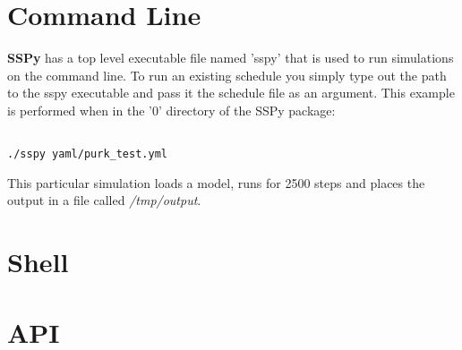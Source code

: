 \documentclass[12pt]{article}
\begin{document}
\section*{Command Line}

	{\bf SSPy} has a top level executable file named 'sspy' that is used to run simulations on the command line. To run an existing schedule you simply type out the path to the sspy executable and pass it the schedule file as an argument. This example is performed when in the '0' directory of the SSPy package:
	
\begin{verbatim}

./sspy yaml/purk_test.yml

\end{verbatim}

This particular simulation loads a model, runs for 2500 steps and places the output in a file called {\it /tmp/output}.

\section*{Shell}


\section*{API}
\end{document}
